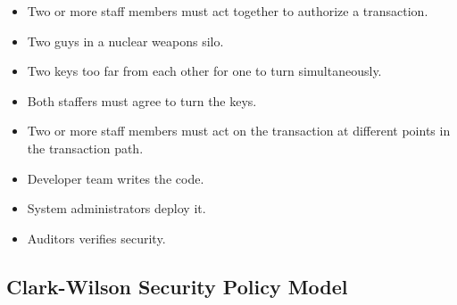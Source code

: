 \begin{frame}
  \begin{example}
    \begin{itemize}
      \item Two or more staff members must act together to authorize 
        a transaction.
    \end{itemize}
  \end{example}

  \pause{}

  \begin{example}
    \begin{itemize}
      \item Two guys in a nuclear weapons silo.
      \item Two keys too far from each other for one to turn simultaneously.
      \item Both staffers must agree to turn the keys.
    \end{itemize}
  \end{example}
\end{frame}

\begin{frame}
  \begin{example}
    \begin{itemize}
      \item Two or more staff members must act on the transaction at different 
        points in the transaction path.
    \end{itemize}
  \end{example}
  
  \pause{}

  \begin{example}
    \begin{itemize}
      \item Developer team writes the code.
      \item System administrators deploy it.
      \item Auditors verifies security.
    \end{itemize}
  \end{example}
\end{frame}

\subsection{Clark-Wilson Security Policy Model}

